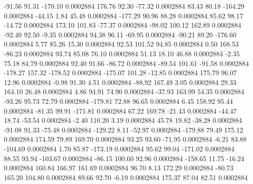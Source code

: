       -91.56       91.31     -170.10     0.0002884
      176.76       92.30      -77.32     0.0002884
       83.43       80.18     -164.29     0.0002884
      -44.15        1.84       45.48     0.0002884
     -177.29       90.96       88.28     0.0002884
       85.62       98.17      -14.72     0.0002884
      173.10      101.83      -77.37     0.0002884
      -98.02      100.12      162.89     0.0002884
      -92.40       92.50       -9.35     0.0002884
       94.38       96.11      -69.95     0.0002884
      -90.21       89.20     -176.60     0.0002884
        5.77       85.26       15.30     0.0002884
       92.53      101.52       94.85     0.0002884
        0.50      168.53      -86.23     0.0002884
       93.74       85.08       76.10     0.0002884
       51.13       18.10       46.88     0.0002884
       -2.35       75.18       84.79     0.0002884
       92.40       91.66      -86.72     0.0002884
      -89.54      101.61      -91.58     0.0002884
     -178.27      157.32     -178.52     0.0002884
     -175.07      101.28      -12.85     0.0002884
      175.79       96.07       12.96     0.0002884
       -0.98       91.30        4.51     0.0002884
      -88.92      167.49        3.05     0.0002884
       29.33      164.10       26.48     0.0002884
        4.86       94.91       74.90     0.0002884
      -37.93      163.99       54.35     0.0002884
      -93.26       95.73       72.79     0.0002884
     -179.81       72.88       96.65     0.0002884
        6.45      158.92       95.44     0.0002884
      -81.35       99.91     -171.81     0.0002884
       67.22      169.78      -21.43     0.0002884
      -44.47       18.74      -53.54     0.0002884
       -2.40      110.20        3.19     0.0002884
       45.78       19.82      -38.28     0.0002884
      -91.08       91.33      -75.48     0.0002884
     -129.22        8.11      -52.97     0.0002884
     -179.88       79.49      175.12     0.0002884
      174.59       79.89      169.70     0.0002884
       93.25       93.60      -71.95     0.0002884
       -6.21       83.88     -104.69     0.0002884
        1.70       85.87     -173.19     0.0002884
       95.62       99.04     -171.02     0.0002884
       88.55       93.94     -103.67     0.0002884
      -86.15      100.60       92.96     0.0002884
     -158.65       11.75      -16.24     0.0002884
      160.84      166.97      161.69     0.0002884
       96.70        8.13      172.29     0.0002884
      -80.73      165.20      104.80     0.0002884
       89.66       92.70       -6.19     0.0002884
      175.37       87.04       82.51     0.0002884
